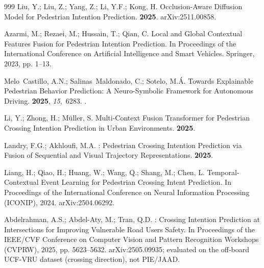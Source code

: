 \documentclass[mti,article,submit,moreauthors]{Definitions/mdpi}
\begin{document}
\begin{thebibliography}{999}
Liu, Y.; Liu, Z.; Yang, Z.; Li, Y.F.; Kong, H.
\newblock Occlusion-Aware Diffusion Model for Pedestrian Intention Prediction.
 {\bf
  2025}.
\newblock arXiv:2511.00858.

Azarmi, M.; Rezaei, M.; Hussain, T.; Qian, C.
\newblock Local and Global Contextual Features Fusion for Pedestrian Intention
  Prediction.
\newblock In Proceedings of the International Conference on Artificial
  Intelligence and Smart Vehicles. Springer,  2023, pp. 1--13.

Melo~Castillo, A.N.; Salinas~Maldonado, C.; Sotelo, M.{\'A}.
\newblock Towards Explainable Pedestrian Behavior Prediction: A Neuro-Symbolic
  Framework for Autonomous Driving.
 {\bf 2025}, {\em 15},~6283.
.

Li, Y.; Zhong, H.; M{\"u}ller, S.
\newblock Multi-Context Fusion Transformer for Pedestrian Crossing Intention
  Prediction in Urban Environments.
 {\bf 2025}.

Landry, F.G.; Akhloufi, M.A.
: Pedestrian Crossing Intention Prediction via Fusion
  of Sequential and Visual Trajectory Representations.
 {\bf 2025}.

Liang, H.; Qiao, H.; Huang, W.; Wang, Q.; Shang, M.; Chen, L.
\newblock Temporal-Contextual Event Learning for Pedestrian Crossing Intent
  Prediction.
\newblock In Proceedings of the International Conference on Neural Information
  Processing (ICONIP),  2024.
\newblock arXiv:2504.06292.

Abdelrahman, A.S.; Abdel-Aty, M.; Tran, Q.D.
: Crossing Intention Prediction at Intersections for
  Improving Vulnerable Road Users Safety.
\newblock In Proceedings of the IEEE/CVF Conference on Computer Vision and
  Pattern Recognition Workshops (CVPRW),  2025, pp. 5623--5632.
\newblock arXiv:2505.09935; evaluated on the off-board UCF-VRU dataset
  (crossing direction), not PIE/JAAD.


\end{thebibliography}
\end{document}
